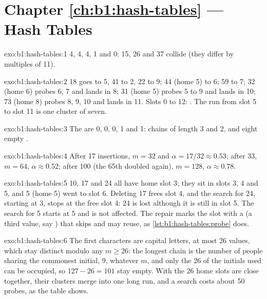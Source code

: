 \section*{Chapter \ref{ch:b1:hash-tables} --- Hash Tables}

\begin{solution}{exo:b1:hash-tables:1}
 4, 4, 4, 1 and 0: 15, 26 and 37 collide (they differ by multiples of 11).
\end{solution}

\begin{solution}{exo:b1:hash-tables:2}
18 goes to 5, 41 to 2, 22 to 9; 44 (home 5) to 6; 59 to 7; 32 (home 6) probes 6, 7 and lands in 8; 31 (home 5) probes
5 to 9 and lands in 10; 73 (home 8) probes 8, 9, 10 and lands in 11. Slots 0 to 12: . The run from slot 5 to slot 11 is one cluster of seven.
\end{solution}

\begin{solution}{exo:b1:hash-tables:3}
The  are 0, 0, 0, 1 and 1: chains of length 3 and 2, and eight empty .
\end{solution}

\begin{solution}{exo:b1:hash-tables:4}
After 17 insertions, $m = 32$ and $\alpha = 17/32 \approx 0.53$; after 33, $m = 64$, $\alpha \approx 0.52$; after 100 (the
65th doubled again), $m = 128$, $\alpha \approx 0.78$.
\end{solution}

\begin{solution}{exo:b1:hash-tables:5}
10, 17 and 24 all have home slot 3; they sit in slots 3, 4 and 5, and 5 (home 5) went to slot 6. Deleting 17 frees slot
4, and the search for 24, starting at 3, stops at the free slot 4: 24 is lost although it is still in slot 5. The search
for 5 starts at 5 and is not affected. The repair marks the slot with a  (a third value, say ) that
 skips and  may reuse, as \cref{lst:b1:hash-tables:probe} does.
\end{solution}

\begin{solution}{exo:b1:hash-tables:6}
The first characters are capital letters, at most 26 values, which stay distinct modulo any $m \geq 26$: the longest
chain is the number of people sharing the commonest initial, 9, whatever $m$, and only the 26  of the initials
used can be occupied, so $127 - 26 = 101$ stay empty. With  the 26 home slots are close together, their
clusters merge into one long run, and a search costs about 50 probes, as the table shows.
\end{solution}

